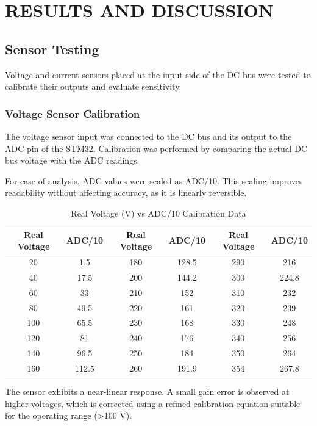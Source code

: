 \chapter{RESULTS AND DISCUSSION} \label{chap-result}
\thispagestyle{empty}



\section{Sensor Testing}
Voltage and current sensors placed at the input side of the DC bus were tested to calibrate their outputs and evaluate sensitivity.

\subsection{Voltage Sensor Calibration}
The voltage sensor input was connected to the DC bus and its output to the ADC pin of the STM32. Calibration was performed by comparing the actual DC bus voltage with the ADC readings.

For ease of analysis, ADC values were scaled as ADC/10. This scaling improves readability without affecting accuracy, as it is linearly reversible.

\begin{table}[H]
\centering
\caption{Real Voltage (V) vs ADC/10 Calibration Data}
\label{tab:voltageadc}
\small
\begin{tabular}{cc | cc | cc}
\toprule
\textbf{Real Voltage} & \textbf{ADC/10} & \textbf{Real Voltage} & \textbf{ADC/10} & \textbf{Real Voltage} & \textbf{ADC/10} \\ \midrule
20  & 1.5  & 180 & 128.5 & 290 & 216   \\
40  & 17.5 & 200 & 144.2 & 300 & 224.8 \\
60  & 33   & 210 & 152   & 310 & 232   \\
80  & 49.5 & 220 & 161   & 320 & 239   \\
100 & 65.5 & 230 & 168   & 330 & 248   \\
120 & 81   & 240 & 176   & 340 & 256   \\
140 & 96.5 & 250 & 184   & 350 & 264   \\
160 & 112.5& 260 & 191.9 & 354 & 267.8 \\ \bottomrule
\end{tabular}
\end{table}

The sensor exhibits a near-linear response. A small gain error is observed at higher voltages, which is corrected using a refined calibration equation suitable for the operating range (>100 V).

